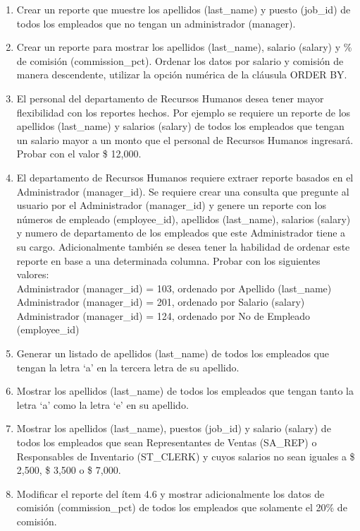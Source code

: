 \begin{enumerate}[1.]
	\item Crear un reporte que muestre los apellidos (last\_name) y puesto (job\_id) de todos los empleados que no tengan un administrador (manager).
	\\ 

	\item Crear un reporte para mostrar los apellidos (last\_name), salario (salary) y \% de comisión (commission\_pct). Ordenar los datos por salario y comisión de manera descendente, utilizar la opción numérica de la cláusula ORDER BY.
	\\ 

	\item El personal del departamento de Recursos Humanos desea tener mayor flexibilidad con los reportes hechos. Por ejemplo se requiere un reporte de los apellidos (last\_name) y salarios (salary) de todos los empleados que tengan un salario mayor a un monto que el personal de Recursos Humanos ingresará. Probar con el valor \$ 12,000.
	\\ 

	\item El departamento de Recursos Humanos requiere extraer reporte basados en el Administrador (manager\_id). Se requiere crear una consulta que pregunte al usuario por el Administrador (manager\_id) y genere un reporte con los números de empleado (employee\_id), apellidos (last\_name), salarios (salary) y numero de departamento de los empleados que este Administrador tiene a su cargo. Adicionalmente también se desea tener la habilidad de ordenar este reporte en base a una determinada columna. Probar con los siguientes valores:
	\\Administrador (manager\_id) = 103, ordenado por Apellido (last\_name)
	\\Administrador (manager\_id) = 201, ordenado por Salario (salary)
	\\Administrador (manager\_id) = 124, ordenado por No de Empleado (employee\_id)
	\\ 

	\item Generar un listado de apellidos (last\_name) de todos los empleados que tengan la letra ‘a’ en la tercera letra de su apellido.
	\\

	\item Mostrar los apellidos (last\_name) de todos los empleados que tengan tanto la letra ‘a’ como la letra ‘e’ en su apellido.
	\\ 

	\item Mostrar los apellidos (last\_name), puestos (job\_id) y salario (salary) de todos los empleados que sean Representantes de Ventas (SA\_REP) o Responsables de Inventario (ST\_CLERK) y cuyos salarios no sean iguales a \$ 2,500, \$ 3,500 o \$ 7,000.
	\\ 

	\item Modificar el reporte del ítem 4.6 y mostrar adicionalmente los datos de comisión (commission\_pct) de todos los empleados que solamente el 20\% de comisi\'on.
	\\ 

\end{enumerate}

